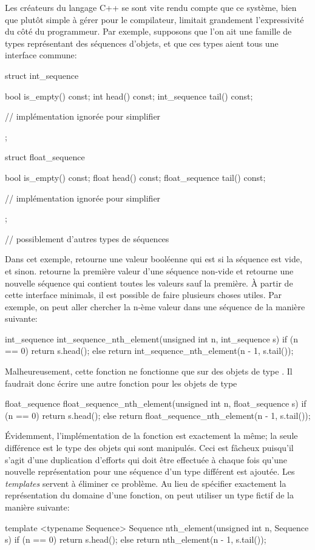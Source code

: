 Les créateurs du langage C++ se sont vite rendu compte que ce système,
bien que plutôt simple à gérer pour le compilateur, limitait grandement
l'expressivité du côté du programmeur. Par exemple, supposons que l'on
ait une famille de types représentant des séquences d'objets, et que ces
types aient tous une interface commune:

\begin{cpp}
    struct int_sequence {
        bool is_empty() const;
        int head() const;
        int_sequence tail() const;

        // implémentation ignorée pour simplifier
    };

    struct float_sequence {
        bool is_empty() const;
        float head() const;
        float_sequence tail() const;

        // implémentation ignorée pour simplifier
    };

    // possiblement d'autres types de séquences
\end{cpp}

Dans cet exemple,  retourne une valeur booléenne qui est 
si la séquence est vide, et  sinon.  retourne la première
valeur d'une séquence non-vide et  retourne une nouvelle séquence
qui contient toutes les valeurs sauf la première. À partir de cette interface
minimals, il est possible de faire plusieurs choses utiles. Par exemple, on
peut aller chercher la n-ème valeur dans une séquence de la manière suivante:
\begin{cpp}
    int_sequence int_sequence_nth_element(unsigned int n, int_sequence s) {
        if (n == 0) return s.head();
        else        return int_sequence_nth_element(n - 1, s.tail());
    }
\end{cpp}

Malheureusement, cette fonction ne fonctionne que sur des objets de type
. Il faudrait donc écrire une autre fonction pour les
objets de type 
\begin{cpp}
    float_sequence float_sequence_nth_element(unsigned int n, float_sequence s) {
        if (n == 0) return s.head();
        else        return float_sequence_nth_element(n - 1, s.tail());
    }
\end{cpp}

Évidemment, l'implémentation de la fonction est exactement la même; la seule
différence est le type des objets qui sont manipulés. Ceci est fâcheux puisqu'il
s'agit d'une duplication d'efforts qui doit être effectuée à chaque fois qu'une
nouvelle représentation pour une séquence d'un type différent est ajoutée. Les
\textit{templates} servent à éliminer ce problème. Au lieu de spécifier exactement
la représentation du domaine d'une fonction, on peut utiliser un type fictif de la
manière suivante:
\begin{cpp}
    template <typename Sequence>
    Sequence nth_element(unsigned int n, Sequence s) {
        if (n == 0) return s.head();
        else        return nth_element(n - 1, s.tail());
    }
\end{cpp}


